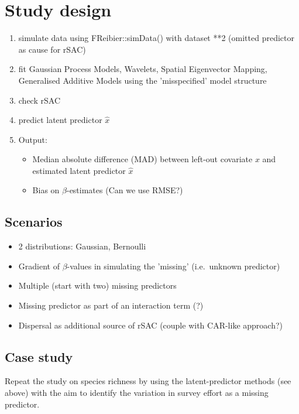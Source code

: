 \documentclass[11pt]{article}
\begin{document}
\section{Study design}
\begin{enumerate}
	\item simulate data using FReibier::simData() with dataset **2 (omitted predictor as cause for rSAC)
	\item fit Gaussian Process Models, Wavelets, Spatial Eigenvector Mapping, Generalised Additive Models using the 'misspecified' model structure
	\item check rSAC
	\item predict latent predictor $\hat{x}$
	\item Output:
	\begin{itemize}
		\item Median absolute difference (MAD) between left-out covariate $x$ and estimated latent predictor $\hat{x}$
		\item Bias on $\beta$-estimates (Can we use RMSE?)
	\end{itemize}
\end{enumerate}

\subsection{Scenarios}
\begin{itemize}
	\item 2 distributions: Gaussian, Bernoulli
	\item Gradient of $\beta$-values in simulating the 'missing' (i.e.~unknown predictor)
	\item Multiple (start with two) missing predictors
	\item Missing predictor as part of an interaction term (?)
	\item Dispersal as additional source of rSAC (couple with CAR-like approach?)
\end{itemize}

\subsection{Case study}
Repeat the study on species richness by \citet{Mahecha2008} using the latent-predictor methods (see above) with the aim to identify the variation in survey effort as a missing predictor. 

 

\end{document}
